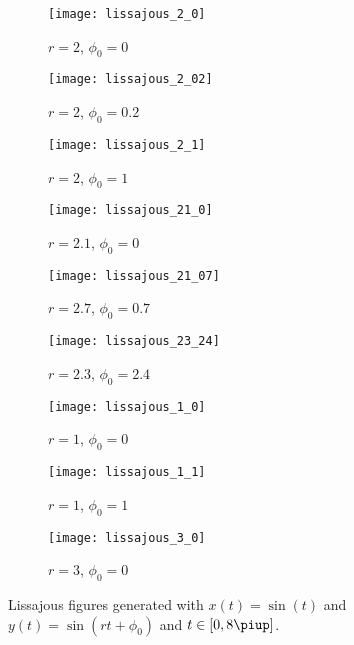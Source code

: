 \documentclass[11pt, english, fleqn, DIV=15, headinclude, BCOR=2cm]{scrreprt}
\begin{document}
\begin{figure}
    \centering
    \begin{subfigure}[c]{0.3\linewidth}
        \centering
        \texttt{[image: lissajous\_2\_0]}
        \caption{%
            $r = 2$, $\phi_0 = 0$
            }
        \label{fig:/1}
    \end{subfigure}
    \hfill
    \begin{subfigure}[c]{0.3\linewidth}
        \centering
        \texttt{[image: lissajous\_2\_02]}
        \caption{%
            $r = 2$, $\phi_0 = 0.2$
            }
        \label{fig:/1}
    \end{subfigure}
    \hfill
    \begin{subfigure}[c]{0.3\linewidth}
        \centering
        \texttt{[image: lissajous\_2\_1]}
        \caption{%
            $r = 2$, $\phi_0 = 1$
            }
        \label{fig:/1}
    \end{subfigure}
    \hfill
    \begin{subfigure}[c]{0.3\linewidth}
        \centering
        \texttt{[image: lissajous\_21\_0]}
        \caption{%
            $r = 2.1$, $\phi_0 = 0$
            }
        \label{fig:/1}
    \end{subfigure}
    \hfill
    \begin{subfigure}[c]{0.3\linewidth}
        \centering
        \texttt{[image: lissajous\_21\_07]}
        \caption{%
            $r = 2.7$, $\phi_0 = 0.7$
            }
        \label{fig:/1}
    \end{subfigure}
    \hfill
    \begin{subfigure}[c]{0.3\linewidth}
        \centering
        \texttt{[image: lissajous\_23\_24]}
        \caption{%
            $r = 2.3$, $\phi_0 = 2.4$
            }
        \label{fig:/1}
    \end{subfigure}
    \hfill
    \begin{subfigure}[c]{0.3\linewidth}
        \centering
        \texttt{[image: lissajous\_1\_0]}
        \caption{%
            $r = 1$, $\phi_0 = 0$
            }
        \label{fig:/1}
    \end{subfigure}
    \hfill
    \begin{subfigure}[c]{0.3\linewidth}
        \centering
        \texttt{[image: lissajous\_1\_1]}
        \caption{%
            $r = 1$, $\phi_0 = 1$
            }
        \label{fig:/1}
    \end{subfigure}
    \hfill
    \begin{subfigure}[c]{0.3\linewidth}
        \centering
        \texttt{[image: lissajous\_3\_0]}
        \caption{%
            $r = 3$, $\phi_0 = 0$
            }
        \label{fig:/1}
    \end{subfigure}
    \hfill
    \caption{%
        Lissajous figures generated with $x(t) = \sin(t)$ and $y(t) = \sin(rt +
        \phi_0)$ and $t \in [0, 8 \piup]$.
        }
    \label{fig:lissajous}
\end{figure}

\end{document}
